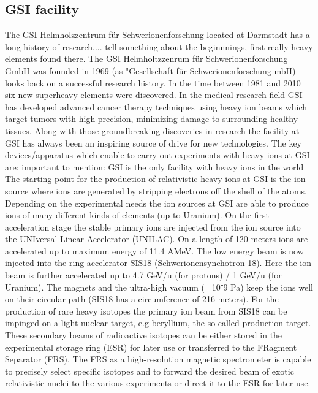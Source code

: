 \subsection{GSI facility}
The GSI Helmholzzentrum f\"ur Schwerionenforschung located at Darmstadt has a long history of research.... tell something about the beginnnings, first really heavy elements found there.\newline
The GSI Helmholtzzenrum f\"ur Schwerionenforschung GmbH was founded in 1969 (as "Gesellschaft f\"ur Schwerionenforschung mbH) looks back on a successful research history. In the time between 1981 and 2010 six new  superheavy elements were discovered. \newline
In the medical research field GSI has developed advanced cancer therapy techniques using heavy ion beams which target tumors with high precision, minimizing damage to surrounding healthy tissues.\newline
Along with those groundbreaking discoveries in research the facility at GSI has always been an inspiring source of drive for new technologies.\newline
The key devices/apparatus which enable to carry out experiments with heavy ions at GSI are:
important to mention: GSI is the only facility with heavy ions in the world
The starting point for the production of relativistic heavy ions at GSI is the ion source where ions are generated by stripping electrons off the shell of the atoms. Depending on the experimental needs the ion sources at GSI are able to produce ions of many different kinds of elements (up to Uranium).\newline
On the first acceleration stage the stable primary ions are injected from the ion source into the UNIversal Linear Accelerator (UNILAC). On a length of 120 meters ions are accelerated up to maximum energy of 11.4 AMeV. The low energy beam is now injected into the ring accelerator SIS18 (Schwerionensynchotron 18). Here the ion beam is further accelerated up to 4.7 GeV/u (for protons) / 1 GeV/u (for Uranium). The magnets and  the ultra-high vacuum (~ 10⁻9 Pa) keep the ions well on their circular path (SIS18 has a circumference of 216 meters). For the production of rare heavy isotopes the primary ion beam from SIS18 can be impinged on a light nuclear target, e.g beryllium, the so called production target. These secondary beams of radioactive isotopes can be either stored in the experimental storage ring (ESR) for later use or transferred to the FRagment Separator (FRS). The FRS as a high-resolution magnetic spectrometer is capable to precisely select specific isotopes and to forward the desired beam of exotic relativistic nuclei to the various experiments or direct it to the ESR for later use.\newline
